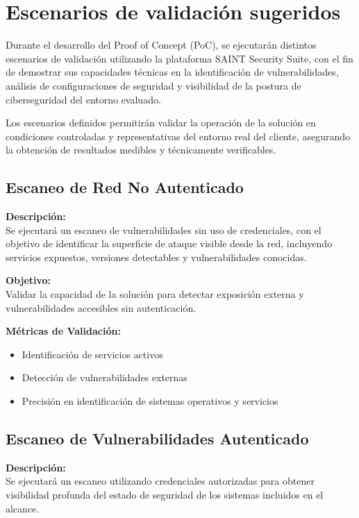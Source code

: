 \documentclass[a4paper]{article}
\begin{document}
    \newpage

    \section{Escenarios de validación sugeridos}
    Durante el desarrollo del Proof of Concept (PoC), se ejecutarán distintos escenarios de validación utilizando la plataforma SAINT Security Suite, con el fin de demostrar sus capacidades técnicas en la identificación de vulnerabilidades, análisis de configuraciones de seguridad y visibilidad de la postura de ciberseguridad del entorno evaluado.

    Los escenarios definidos permitirán validar la operación de la solución en condiciones controladas y representativas del entorno real del cliente, asegurando la obtención de resultados medibles y técnicamente verificables.

    \subsection{Escaneo de Red No Autenticado}
    \textbf{Descripción:} \\
    Se ejecutará un escaneo de vulnerabilidades sin uso de credenciales, con el objetivo de identificar la superficie de ataque visible desde la red, incluyendo servicios expuestos, versiones detectables y vulnerabilidades conocidas.

    \textbf{Objetivo:}\\
    Validar la capacidad de la solución para detectar exposición externa y vulnerabilidades accesibles sin autenticación.

    \textbf{Métricas de Validación:}
    \begin{itemize}
        \item Identificación de servicios activos
        \item Detección de vulnerabilidades externas
        \item Precisión en identificación de sistemas operativos y servicios
    \end{itemize}

    \subsection{Escaneo de Vulnerabilidades Autenticado}
    \textbf{Descripción:}\\
    Se ejecutará un escaneo utilizando credenciales autorizadas para obtener visibilidad profunda del estado de seguridad de los sistemas incluidos en el alcance.
\end{document}
